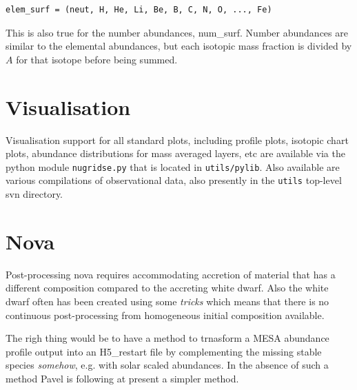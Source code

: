 \begin{verbatim}
elem_surf = (neut, H, He, Li, Be, B, C, N, O, ..., Fe)
\end{verbatim}

This is also true for the number abundances, num\_surf.  Number abundances are
similar to the elemental abundances, but each isotopic mass fraction is divided
by $A$ for that isotope before being summed.

\section{Visualisation}
Visualisation support for all standard plots, including profile plots,
isotopic chart plots, abundance distributions for mass averaged
layers, etc are available via the python module
 \texttt{nugridse.py} that is located in
\texttt{utils/pylib}. Also available are various compilations of
observational data, also presently in the \texttt{utils} top-level svn
directory.

\section{Nova}

Post-processing nova requires accommodating accretion of material that
has a different composition compared to the accreting white
dwarf. Also the white dwarf often has been created using some
\emph{tricks} which means that there is no continuous post-processing
from homogeneous initial composition available. 

The righ thing would be to have a method to trnasform a MESA abundance
profile output into an H5\_restart file by complementing the missing
stable species \emph{somehow}, e.g. with solar scaled abundances. In
the absence of such a method Pavel is following at present a simpler
method. 

